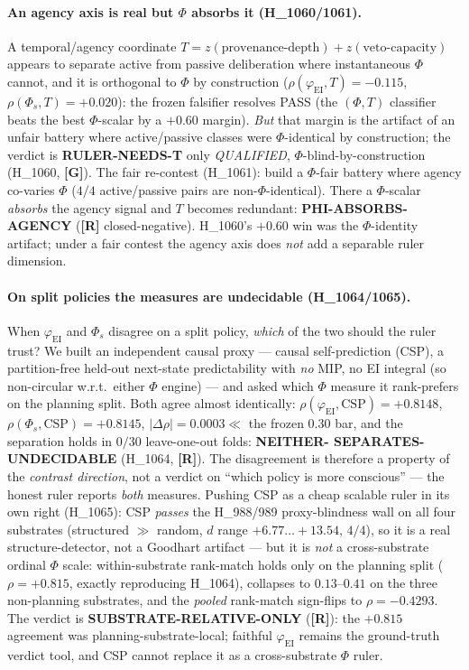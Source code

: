 \documentclass[11pt,a4paper]{article}
\providecommand{\tierGreen}{\textcolor{green!50!black}{\textbf{[G]}}}
\providecommand{\tierRed}{\textcolor{red!70!black}{\textbf{[R]}}}
\newcommand{\faithful}{\ensuremath{\varphi_{\mathrm{EI}}}}
\newcommand{\bigphi}{\ensuremath{\Phi_{s}}}
\begin{document}
\paragraph{An agency axis is real but $\Phi$ absorbs it (H\_1060/1061).} A
temporal/agency coordinate $T=z(\text{provenance-depth})+z(\text{veto-capacity})$
appears to separate active from passive deliberation where instantaneous $\Phi$
cannot, and it is orthogonal to $\Phi$ by construction
($\rho(\faithful,T)=-0.115$, $\rho(\bigphi,T)=+0.020$): the frozen falsifier
resolves PASS (the $(\Phi,T)$ classifier beats the best $\Phi$-scalar by a
$+0.60$ margin). \emph{But} that margin is the artifact of an unfair battery
where active/passive classes were $\Phi$-identical by construction; the verdict
is \textbf{RULER-NEEDS-T} only \emph{QUALIFIED}, $\Phi$-blind-by-construction
(H\_1060, \tierGreen). The fair re-contest (H\_1061): build a $\Phi$-fair battery
where agency co-varies $\Phi$ ($4/4$ active/passive pairs are non-$\Phi$-identical).
There a $\Phi$-scalar \emph{absorbs} the agency signal and $T$ becomes redundant:
\textbf{PHI-ABSORBS-AGENCY} (\tierRed{} closed-negative). H\_1060's $+0.60$ win
was the $\Phi$-identity artifact; under a fair contest the agency axis does
\emph{not} add a separable ruler dimension.

\paragraph{On split policies the measures are undecidable (H\_1064/1065).}
When \faithful{} and \bigphi{} disagree on a split policy, \emph{which} of the two
should the ruler trust? We built an independent causal proxy --- causal
self-prediction (CSP), a partition-free held-out next-state predictability with
\emph{no} MIP, no EI integral (so non-circular w.r.t.\ either $\Phi$ engine) ---
and asked which $\Phi$ measure it rank-prefers on the planning split. Both agree
almost identically: $\rho(\faithful,\text{CSP})=+0.8148$,
$\rho(\bigphi,\text{CSP})=+0.8145$, $|\Delta\rho|=0.0003\ll$ the frozen $0.30$
bar, and the separation holds in $0/30$ leave-one-out folds: \textbf{NEITHER-%
SEPARATES-UNDECIDABLE} (H\_1064, \tierRed). The disagreement is therefore a
property of the \emph{contrast direction}, not a verdict on ``which policy is
more conscious'' --- the honest ruler reports \emph{both} measures. Pushing CSP
as a cheap scalable ruler in its own right (H\_1065): CSP \emph{passes} the
H\_988/989 proxy-blindness wall on all four substrates (structured $\gg$ random,
$d$ range $+6.77\ldots+13.54$, $4/4$), so it is a real structure-detector, not a
Goodhart artifact --- but it is \emph{not} a cross-substrate ordinal $\Phi$ scale:
within-substrate rank-match holds only on the planning split ($\rho=+0.815$,
exactly reproducing H\_1064), collapses to $0.13$--$0.41$ on the three
non-planning substrates, and the \emph{pooled} rank-match sign-flips to
$\rho=-0.4293$. The verdict is \textbf{SUBSTRATE-RELATIVE-ONLY} (\tierRed): the
$+0.815$ agreement was planning-substrate-local; faithful \faithful{} remains the
ground-truth verdict tool, and CSP cannot replace it as a cross-substrate $\Phi$
ruler.
\end{document}
